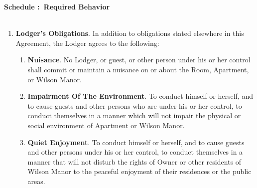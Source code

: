 \documentclass[12pt,letterpaper]{article}
\newcounter{schedulecounter}
\renewcommand{\theschedulecounter}{\Alph{schedulecounter}}
\newenvironment{schedule}[1] {\newpage
	\refstepcounter{schedulecounter}
	\noindent \textbf{\Large Schedule \theschedulecounter:~{#1}}\\ \\
}{}
\newcommand{\behavior}{Required Behavior}
\newcommand{\management}{Management}
\newcommand{\condo}{Wilson Manor}
\newcommand{\apt}{Apartment}
\newcommand{\room}{Room}
\begin{document}
\begin{schedule}{\behavior{}}
\begin{enumerate}
\begin{enumerate}
\begin{enumerate}
						As used throughout this Agreement, ``other person under his or her control' shall mean any person other than the Lodger, or guest, who enters \condo{} property at the express or implied invitation of the Lodger, or his or her guest. 
				\end{enumerate}
			\item \textbf{Criminal Drug Related Activity}. \label{drug}
				No Lodger, guest, or other person under his or her control shall engage in any Drug-Related Criminal Activity on or off the property of \condo{}. As used in this Agreement, ``Drug-Related Criminal Activity' shall mean the illegal manufacture, sale, distribution, use or possession with the intent to manufacture, sell, distribute or use a controlled substance as defined in section 102 of the Controlled Substances Act (21 U.S.C. 802). The Lodger specifically understands and acknowledges that: 
				\begin{enumerate}
					\item The Lodger has an affirmative obligation to ensure that the Lodger, or guest, or other person under his or her control do not commit any Drug-Related Criminal Activity; 
					\item The Lodger shall be held strictly and vicariously liable for any such Drug-Related Criminal Activity which is committed by a guest, or other person under his or her control; and 
					\item \management{} will terminate this Agreement for any such criminal or illegal act, regardless of whether there is an arrest or a conviction.
				\end{enumerate}
		\end{enumerate}
	\item \textbf{Lodger's Obligations}.
		In addition to obligations stated elsewhere in this Agreement, the Lodger agrees to the following: 
		\begin{enumerate}
			\item \textbf{Nuisance}. No Lodger, or guest, or other person under his or her control shall commit or maintain a nuisance on or about the \room{}, \apt{}, or \condo{}. 
			\item \textbf{Impairment Of The Environment}. To conduct himself or herself, and to cause guests and other persons who are under his or her control, to conduct themselves in a manner which will not impair the physical or social environment of \apt{} or \condo{}. 
			\item \textbf{Quiet Enjoyment}. To conduct himself or herself, and to cause guests and other persons under his or her control, to conduct themselves in a manner that will not disturb the rights of Owner or other residents of \condo{} to the peaceful enjoyment of their residences or the public areas. 

\end{enumerate}
\end{enumerate}
\end{schedule}
\end{document}
